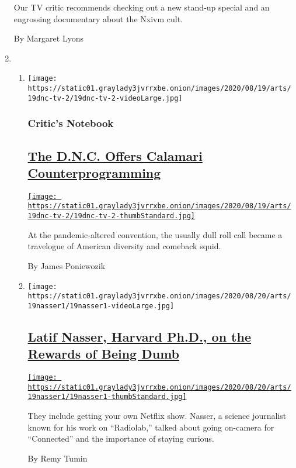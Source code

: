 \begin{enumerate}
  Our TV critic recommends checking out a new stand-up special and an
  engrossing documentary about the Nxivm cult.

  By Margaret Lyons
\item
  \begin{enumerate}
  \def\labelenumii{\arabic{enumii}.}
  \item
    \texttt{[image: https://static01.graylady3jvrrxbe.onion/images/2020/08/19/arts/19dnc-tv-2/19dnc-tv-2-videoLarge.jpg]}

    \hypertarget{critics-notebook-1}{%
    \subsubsection{Critic's Notebook}\label{critics-notebook-1}}

    \hypertarget{the-dnc-offers-calamari-counterprogramming}{%
    \subsection{\texorpdfstring{\href{/2020/08/19/arts/television/dnc-roll-call-vote.html}{The
    D.N.C. Offers Calamari
    Counterprogramming}}{The D.N.C. Offers Calamari Counterprogramming}}\label{the-dnc-offers-calamari-counterprogramming}}

    \href{/2020/08/19/arts/television/dnc-roll-call-vote.html}{\texttt{[image: https://static01.graylady3jvrrxbe.onion/images/2020/08/19/arts/19dnc-tv-2/19dnc-tv-2-thumbStandard.jpg]}}

    At the pandemic-altered convention, the usually dull roll call
    became a travelogue of American diversity and comeback squid.

    By James Poniewozik
  \item
    \texttt{[image: https://static01.graylady3jvrrxbe.onion/images/2020/08/20/arts/19nasser1/19nasser1-videoLarge.jpg]}

    \hypertarget{latif-nasser-harvard-phd-on-the-rewards-of-being-dumb}{%
    \subsection{\texorpdfstring{\href{/2020/08/19/arts/television/connected-latif-nasser-netflix.html}{Latif
    Nasser, Harvard Ph.D., on the Rewards of Being
    Dumb}}{Latif Nasser, Harvard Ph.D., on the Rewards of Being Dumb}}\label{latif-nasser-harvard-phd-on-the-rewards-of-being-dumb}}

    \href{/2020/08/19/arts/television/connected-latif-nasser-netflix.html}{\texttt{[image: https://static01.graylady3jvrrxbe.onion/images/2020/08/20/arts/19nasser1/19nasser1-thumbStandard.jpg]}}

    They include getting your own Netflix show. Nasser, a science
    journalist known for his work on ``Radiolab,'' talked about going
    on-camera for ``Connected'' and the importance of staying curious.

    By Remy Tumin
  \end{enumerate}
\end{enumerate}

